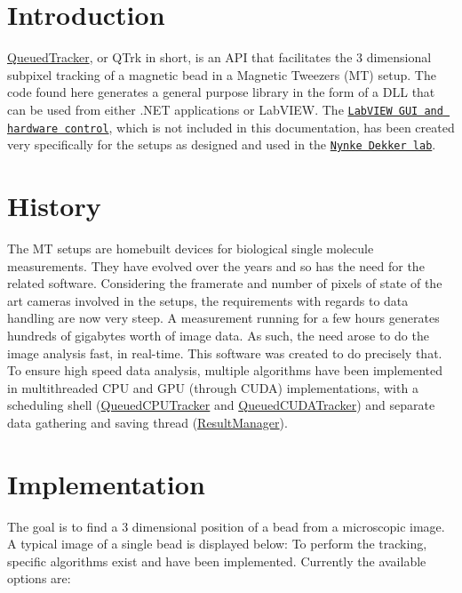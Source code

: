\hypertarget{index_intro_sec}{}\section{Introduction}\label{index_intro_sec}
\hyperlink{class_queued_tracker}{Queued\+Tracker}, or Q\+Trk in short, is an A\+PI that facilitates the 3 dimensional subpixel tracking of a magnetic bead in a Magnetic Tweezers (MT) setup. The code found here generates a general purpose library in the form of a D\+LL that can be used from either .N\+ET applications or Lab\+V\+I\+EW. The \href{https://github.com/NynkeDekkerLab/BeadTracker/tree/master}{\tt Lab\+V\+I\+EW G\+UI and hardware control}, which is not included in this documentation, has been created very specifically for the setups as designed and used in the \href{http://nynkedekkerlab.tudelft.nl/}{\tt Nynke Dekker lab}.\hypertarget{index_hist_sec}{}\section{History}\label{index_hist_sec}
The MT setups are homebuilt devices for biological single molecule measurements. They have evolved over the years and so has the need for the related software. Considering the framerate and number of pixels of state of the art cameras involved in the setups, the requirements with regards to data handling are now very steep. A measurement running for a few hours generates hundreds of gigabytes worth of image data. As such, the need arose to do the image analysis fast, in real-\/time. This software was created to do precisely that. To ensure high speed data analysis, multiple algorithms have been implemented in multithreaded C\+PU and G\+PU (through C\+U\+DA) implementations, with a scheduling shell (\hyperlink{class_queued_c_p_u_tracker}{Queued\+C\+P\+U\+Tracker} and \hyperlink{class_queued_c_u_d_a_tracker}{Queued\+C\+U\+D\+A\+Tracker}) and separate data gathering and saving thread (\hyperlink{class_result_manager}{Result\+Manager}).\hypertarget{index_imple_sec}{}\section{Implementation}\label{index_imple_sec}
The goal is to find a 3 dimensional position of a bead from a microscopic image. A typical image of a single bead is displayed below\+:  To perform the tracking, specific algorithms exist and have been implemented. Currently the available options are\+: \tabulinesep=1mm
